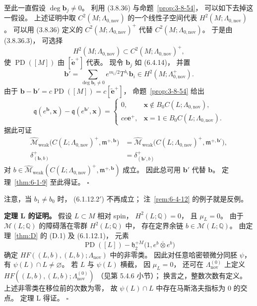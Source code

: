 至此一直假设 $\deg\boldsymbol b_j\ne0$。
利用 (3.8.36) 与命题~\ref{prop:3-8-54}，
可以如下去掉这一假设。
上述证明中取 $C^2(M;\Lambda_{0,\mathrm{nov}})$
的一个线性子空间代表
$H^2(M;\Lambda_{0,\mathrm{nov}})$。
可以用 (3.8.36) 定义的
$C^2(M;\Lambda_{0,\mathrm{nov}})^+$
代替 $C^2(M;\Lambda_{0,\mathrm{nov}})$。
于是由 (3.8.36.3)，
可选择
\[
H^2(M;\Lambda_{0,\mathrm{nov}})
\subset C^2(M;\Lambda_{0,\mathrm{nov}})^+,
\]
使 $\operatorname{PD}([M])$
由 $[\widetilde{\mathbf e}^+]$ 代表。
现令 $\boldsymbol b_j$ 如 (6.4.14)，
并置
\[
\boldsymbol b'
=\sum_{\deg\boldsymbol b_i\ne0}
e^{m_i/2}T^{\lambda_i}\boldsymbol b_i
\in H^2(M;\Lambda_{0,\mathrm{nov}}^+).
\]
由于
$\boldsymbol b-\boldsymbol b'
=c\operatorname{PD}([M])
=c[\widetilde{\mathbf e}^+]$，
命题~\ref{prop:3-8-54} 给出
\begin{equation}
\mathfrak q(e^{\boldsymbol b},\mathbf x)
-\mathfrak q(e^{\boldsymbol b'},\mathbf x)
=\begin{cases}
0,&\mathbf x\notin B_0C(L;\Lambda_{0,\mathrm{nov}}),\\
ce\mathbf e^+,&\mathbf x=1\in B_0C(L;\Lambda_{0,\mathrm{nov}}).
\end{cases}
\tag{6.4.23}\label{eq:6-4-23}
\end{equation}
据此可证
\[
\begin{aligned}
\widehat{\mathcal M}_{\mathrm{weak}}
\bigl(C(L;\Lambda_{0,\mathrm{nov}})^+,
\mathfrak m^{+,\boldsymbol b}\bigr)
&=\widehat{\mathcal M}_{\mathrm{weak}}
\bigl(C(L;\Lambda_{0,\mathrm{nov}})^+,
\mathfrak m^{+,\boldsymbol b'}\bigr),\\
\delta^+_{(\boldsymbol b,b)}
&=\delta^+_{(\boldsymbol b',b)}
\end{aligned}
\]
对
$b\in\widehat{\mathcal M}_{\mathrm{weak}}
(C(L;\Lambda_{0,\mathrm{nov}})^+,
\mathfrak m^{+,\boldsymbol b})$
成立。
因此总可用 $\boldsymbol b'$ 代替 $\boldsymbol b$。
定理~\ref{thm:6-1-9} 至此得证。
\hfill$\square$

注意，当 $b_1\ne b_0$ 时，
(6.1.12.2$'$) 不再成立；
注~\ref{rem:6-4-12} 的例子就是反例。

\noindent\textbf{定理 L 的证明。}
假设 $L\subset M$ 相对 spin，
$H^2(L;\mathbb Q)=0$，
且 $\mu_L=0$。
由于 $\mathcal M(L;\mathbb Q)$
的障碍落在零群 $H^2(L;\mathbb Q)$ 中，
存在定界余链
$b\in\mathcal M(L;\mathbb Q)$。
由定理~\ref{thm:D} 的 \textup{(D.1)}
及 (6.1.12.1)，
元素
\[
\operatorname{PD}([L])
-\mathfrak h_2^{+M}
\bigl(1,e^b\mathbin{\overline\otimes}e^b\bigr)
\]
确定
$HF((L,b),(L,b);\Lambda_{\mathrm{nov}})$
中的非零类。
因此对任意哈密顿微分同胚 $\psi$，
有 $\psi(L)\cap L\ne\varnothing$。
若 $L$ 与 $\psi(L)$ 横截，
因 $\mu_L=0$，
还可在 $\Lambda_{\mathrm{nov}}^{(0)}$
上定义
$HF((L,b),(L,b);\Lambda_{\mathrm{nov}}^{(0)})$
（见第 5.4.6 小节）；
换言之，整数次数有定义。
上述非零类在移位前的次数为零，
故 $\psi(L)\cap L$
中存在马斯洛夫指标为 $0$ 的交点。
定理 L 得证。
\hfill$\square$
